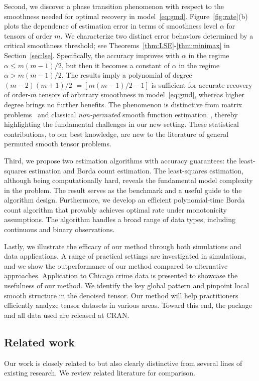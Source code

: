 \documentclass[12pt]{article}
\theoremstyle{definition}
\begin{document}
Second, we discover a phase transition phenomenon with respect to the smoothness needed for optimal recovery in model~\eqref{eq:gmd}. Figure~\ref{fig:rate}(b) plots the dependence of estimation error in terms of smoothness level $\alpha$ for tensors of order $m$. We characterize two distinct error behaviors determined by a critical smoothness threshold; see Theorems~\ref{thm:LSE}-\ref{thm:minimax} in Section~\ref{sec:lse}. Specifically, the accuracy improves with $\alpha$ in the regime $\alpha\leq m(m-1)/2$, but then it becomes a constant of $\alpha$ in the regime $\alpha>m(m-1)/2$. The results imply a polynomial of degree $(m-2)(m+1)/2$ $=[m(m-1)/2-1]$ is sufficient for accurate recovery of order-$m$ tensors of arbitrary smoothness in model~\eqref{eq:gmd}, whereas higher degree brings no further benefits. The phenomenon is distinctive from matrix problems~\citep{klopp2017oracle,gao2015rate} and classical \emph{non-permuted} smooth function estimation~\cite{tsybakov2009introduction}, thereby highlighting the fundamental challenges in our new setting. These statistical contributions, to our best knowledge, are new to the literature of general permuted smooth tensor problems. 

Third, we propose two estimation algorithms with accuracy guarantees: the least-squares estimation and Borda count estimation. The least-squares estimation, although being computationally hard, reveals the fundamental model complexity in the problem. The result serves as the benchmark and a useful guide to the algorithm design. Furthermore, we develop an efficient polynomial-time Borda count algorithm that provably achieves optimal rate under monotonicity assumptions. The algorithm handles a broad range of data types, including continuous and binary observations. 

Lastly, we illustrate the efficacy of our method through both simulations and data applications. A range of practical settings are investigated in simulations, and we show the outperformance of our method compared to alternative approaches.
Application to Chicago crime data is presented to showcase the usefulness of our method. We identify the key global pattern and pinpoint local smooth structure in the denoised tensor. Our method will help practitioners efficiently analyze tensor datasets in various areas. Toward this end, the package and all data used are released at CRAN.

\subsection{Related work}\label{sec:priorwork}
 Our work is closely related to but also clearly distinctive from several lines of existing research. We review related literature for comparison.
\end{document}
